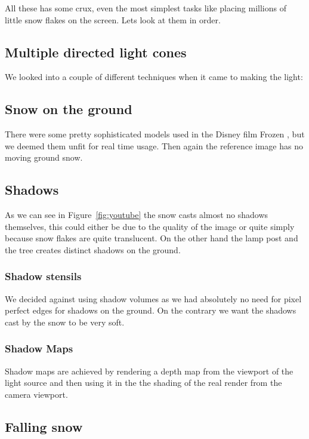 \documentclass[a4paper,12pt]{article}
\begin{document}
All these has some crux, even the most simplest tasks like placing millions of little snow flakes on the screen. Lets look at them in order.


\subsection{Multiple directed light cones}

We looked into a couple of different techniques when it came to making the light:


\subsection{Snow on the ground}

There were some pretty sophisticated models used in the Disney film Frozen \cite{disney-snow}, but we deemed them unfit for real time usage. Then again the reference image has no moving ground snow.


\subsection{Shadows}

As we can see in Figure~\ref{fig:youtube} the snow casts almost no shadows themselves, this could either be due to the quality of the image or quite simply because snow flakes are quite translucent. On the other hand the lamp post and the tree creates distinct shadows on the ground.


\subsubsection{Shadow stensils}

We decided against using shadow volumes as we had absolutely no need for pixel perfect edges for shadows on the ground. On the contrary we want the shadows cast by the snow to be very soft.

\subsubsection{Shadow Maps}

Shadow maps are achieved by rendering a depth map from the viewport of the light source and then using it in the the shading of the real render from the camera viewport.


\subsection{Falling snow}
\end{document}
